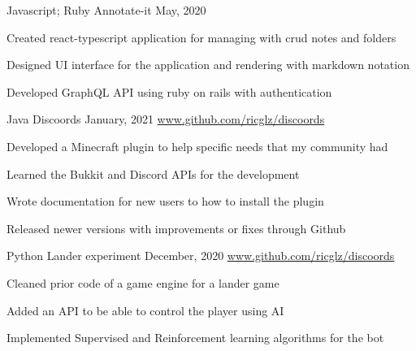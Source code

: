 \begin{cventries}
  \cventry
    {Javascript; Ruby}
    {Annotate-it}
    {May, 2020}
    {}
    {
      \begin{cvitems}
        \item {Created react-typescript application for managing with crud notes and folders}
        \item {Designed UI interface for the application and rendering with markdown notation}
        \item {Developed GraphQL API using ruby on rails with authentication}
      \end{cvitems}
    }

  \cventry
    {Java}
    {Discoords}
    {January, 2021}
    {\url{www.github.com/ricglz/discoords}}
    {
      \begin{cvitems}
        \item {Developed a Minecraft plugin to help specific needs that my community had}
        \item {Learned the Bukkit and Discord APIs for the development}
        \item {Wrote documentation for new users to how to install the plugin}
        \item {Released newer versions with improvements or fixes through Github}
      \end{cvitems}
    }

  \cventry
    {Python}
    {Lander experiment}
    {December, 2020}
    {\url{www.github.com/ricglz/discoords}}
    {
      \begin{cvitems}
        \item {Cleaned prior code of a game engine for a lander game}
        \item {Added an API to be able to control the player using AI}
        \item {Implemented Supervised and Reinforcement learning algorithms for the bot}
      \end{cvitems}
    }
\end{cventries}

